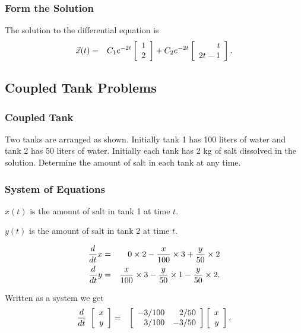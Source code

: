 \begin{frame}
  \frametitle{Form the Solution}
  
  The solution to the differential equation is
  \begin{eqnarray*}
    \vec{x}(t) & = &  C_1 e^{-2t} \vecTwo{1}{2} + C_2 e^{-2t}\vecTwo{t}{2t-1}.
  \end{eqnarray*}
\end{frame}


\subsection{Coupled Tank Problems}


\begin{frame}
  \frametitle{Coupled Tank}

  Two tanks are arranged as shown. Initially tank 1 has 100 liters of
  water and tank 2 has 50 liters of water. Initially each tank has 2
  kg of salt dissolved in the solution. Determine the amount of salt
  in each tank at any time.
  
\end{frame}


\begin{frame}
  \frametitle{System of Equations}

  $x(t)$ is the amount of salt in tank 1 at time $t$.

  $y(t)$ is the amount of salt in tank 2 at time $t$.

  \begin{eqnarray*}
    \deriv{x}{t} & = & 0\times 2 - 
    \frac{x}{100}\times 3 + \frac{y}{50}\times 2 \\
    \deriv{y}{t} & = & \frac{x}{100} \times 3 -
    \frac{y}{50} \times 1 - \frac{y}{50}\times 2.
  \end{eqnarray*}

  Written as a system we get
  \begin{eqnarray*}
    \deriv{~}{t} \vecTwo{x}{y} & = & 
    \arrayTwo{-3/100}{2/50}{3/100}{-3/50} \vecTwo{x}{y}.
  \end{eqnarray*}
  
\end{frame}


